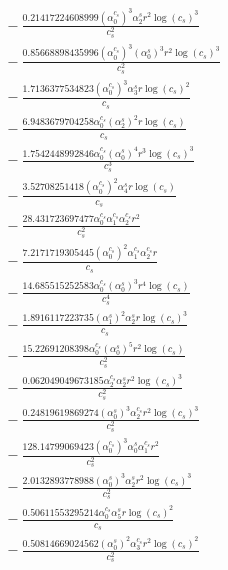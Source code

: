 \documentclass[10pt]{article}
\begin{document}
\begin{align*}
&{}  - \frac{0.21417224608999 \left(\alpha_{0}^{c_s}\right)^{3} \alpha_{2}^s r^{2} \log{\left(c_{s} \right)}^{3}}{c_{s}^{2}} \\
&{}  - \frac{0.85668898435996 \left(\alpha_{0}^{c_s}\right)^{3} \left(\alpha_{0}^s\right)^{3} r^{2} \log{\left(c_{s} \right)}^{3}}{c_{s}^{2}} \\
&{}  - \frac{1.7136377534823 \left(\alpha_{0}^{c_s}\right)^{3} \alpha_{3}^s r \log{\left(c_{s} \right)}^{2}}{c_{s}} \\
&{}  - \frac{6.9483679704258 \alpha_{0}^{c_s} \left(\alpha_{2}^s\right)^{2} r \log{\left(c_{s} \right)}}{c_{s}} \\
&{}  - \frac{1.7542448992846 \alpha_{0}^{c_s} \left(\alpha_{0}^s\right)^{4} r^{3} \log{\left(c_{s} \right)}^{3}}{c_{s}^{3}} \\
&{}  - \frac{3.52708251418 \left(\alpha_{0}^{c_s}\right)^{2} \alpha_{4}^s r \log{\left(c_{s} \right)}}{c_{s}} \\
&{}  - \frac{28.431723697477 \alpha_{0}^{c_s} \alpha_{1}^{c_s} \alpha_{2}^{c_s} r^{2}}{c_{s}^{2}} \\
&{}  - \frac{7.2171719305445 \left(\alpha_{0}^{c_s}\right)^{2} \alpha_{1}^{c_s} \alpha_{2}^{c_s} r}{c_{s}} \\
&{}  - \frac{14.685515252583 \alpha_{0}^{c_s} \left(\alpha_{0}^s\right)^{3} r^{4} \log{\left(c_{s} \right)}}{c_{s}^{4}} \\
&{}  - \frac{1.8916117223735 \left(\alpha_{1}^s\right)^{2} \alpha_{2}^s r \log{\left(c_{s} \right)}^{3}}{c_{s}} \\
&{}  - \frac{15.22691208398 \alpha_{0}^{c_s} \left(\alpha_{0}^s\right)^{5} r^{2} \log{\left(c_{s} \right)}}{c_{s}^{2}} \\
&{}  - \frac{0.062049049673185 \alpha_{2}^{c_s} \alpha_{2}^s r^{2} \log{\left(c_{s} \right)}^{3}}{c_{s}^{2}} \\
&{}  - \frac{0.24819619869274 \left(\alpha_{0}^s\right)^{3} \alpha_{2}^{c_s} r^{2} \log{\left(c_{s} \right)}^{3}}{c_{s}^{2}} \\
&{}  - \frac{128.14799069423 \left(\alpha_{0}^{c_s}\right)^{3} \alpha_{0}^s \alpha_{1}^{c_s} r^{2}}{c_{s}^{2}} \\
&{}  - \frac{2.0132893778988 \left(\alpha_{0}^s\right)^{3} \alpha_{2}^s r^{2} \log{\left(c_{s} \right)}^{3}}{c_{s}^{2}} \\
&{}  - \frac{0.50611553295214 \alpha_{0}^{c_s} \alpha_{5}^s r \log{\left(c_{s} \right)}^{2}}{c_{s}} \\
&{}  - \frac{0.50814669024562 \left(\alpha_{0}^s\right)^{2} \alpha_{3}^{c_s} r^{2} \log{\left(c_{s} \right)}^{2}}{c_{s}^{2}} \\

\end{align*}
\end{document}
